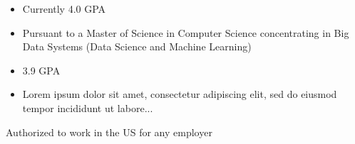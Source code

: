 \documentclass[10pt,a4paper,ragged2e,landscape]{altacv}
\begin{document}
\begin{itemize}
\item Currently 4.0 GPA
\item Pursuant to a Master of Science in Computer Science concentrating in Big Data Systems (Data Science and Machine Learning)
\end{itemize}
\divider

\begin{itemize}
\item  3.9 GPA
\item  Lorem ipsum dolor sit amet, consectetur adipiscing elit, sed do eiusmod tempor incididunt ut labore...
\end{itemize}

\clearpage
\begin{minipage}[]{28cm}
\begin{minipage}{9cm}
\end{minipage}
\hfill
\begin{minipage}{9cm}	
\end{minipage}
\hfill
\begin{minipage}{9cm}	
\end{minipage}
\begin{center}
Authorized to work in the US for any employer
\end{center}
\end{minipage}
\end{document}
